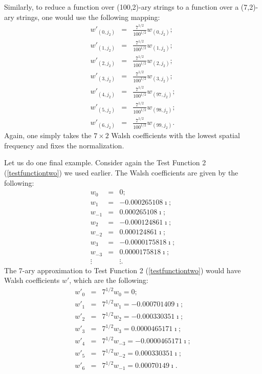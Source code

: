 Similarly, to reduce a function over (100,2)-ary strings
to a function over a (7,2)-ary strings, one would use the following
mapping:
\begin{eqnarray}
w'_{(0,j_2)} &=& \frac{7^{1/2}}{100^{1/2}} w_{(0,j_2)}; \nonumber \\
w'_{(1,j_2)} &=& \frac{7^{1/2}}{100^{1/2}} w_{(1,j_2)}; \nonumber \\
w'_{(2,j_2)} &=& \frac{7^{1/2}}{100^{1/2}} w_{(2,j_2)}; \nonumber \\
w'_{(3,j_2)} &=& \frac{7^{1/2}}{100^{1/2}} w_{(3,j_2)}; \nonumber \\
w'_{(4,j_2)} &=& \frac{7^{1/2}}{100^{1/2}} w_{(97,j_2)}; \nonumber \\
w'_{(5,j_2)} &=& \frac{7^{1/2}}{100^{1/2}} w_{(98,j_2)}; \nonumber \\
w'_{(6,j_2)} &=& \frac{7^{1/2}}{100^{1/2}} w_{(99,j_2)}.
\end{eqnarray}
Again, one simply takes the $7\times 2$ Walsh coefficients with the lowest spatial
frequency and fixes the normalization.

Let us do one final example.  Consider again the Test Function 2
(\ref{testfunctiontwo}) we used earlier.  The Walsh coefficients are
given by the following:
\begin{eqnarray}
w_0&=&0;  \nonumber\\
w_1&=& -0.000265108 \imath; \nonumber\\
w_{-1} &=& 0.000265108 \imath; \nonumber\\
w_2&=& -0.000124861 \imath; \nonumber \\
w_{-2}&=& 0.000124861 \imath; \nonumber\\
w_3 &=& -0.0000175818 \imath;  \nonumber\\
w_{-3} &=& 0.0000175818 \imath; \nonumber\\
\vdots & & \vdots .
\end{eqnarray}
The 7-ary approximation to Test Function 2 (\ref{testfunctiontwo}) would have
Walsh coefficients $w'$, which are the following:
\begin{eqnarray}
w'_0 &=& 7^{1/2} w_0 = 0;\nonumber \\
w'_1 &=& 7^{1/2} w_1 = -0.000701409 \imath; \nonumber\\
w'_2 &=& 7^{1/2} w_2 = -0.000330351 \imath; \nonumber\\
w'_3 &=& 7^{1/2} w_3 = 0.0000465171 \imath; \nonumber \\
w'_4 &=& 7^{1/2} w_{-3} = -0.0000465171 \imath; \nonumber \\
w'_5 &=& 7^{1/2} w_{-2} = 0.000330351 \imath; \nonumber\\
w'_6 &=& 7^{1/2} w_{-1} = 0.00070149 \imath.
\end{eqnarray}

